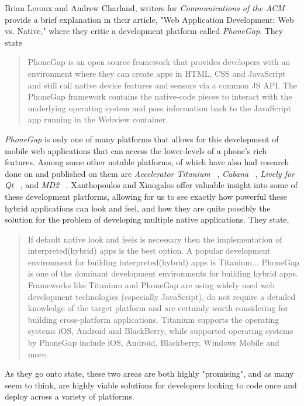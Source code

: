 \documentclass[11pt]{article}
\begin{document}
Brian Leroux and Andrew Charland, writers for {\it Communications of the ACM} provide a brief explanation in their article, "Web Application Development: Web vs. Native," where they critic a development platform called {\it PhoneGap}.  They state

\begin{quote}
PhoneGap is an open source framework that provides developers with an environment where they can create apps in HTML, CSS and JavaScript and still call native device features and sensors via a common JS API.  The PhoneGap framework contains the native-code pieces to interact with the underlying operating system and pass information back to the JavaScript app running in the Webview container. ~\cite{Leroux2011}  
\end{quote}




{\it PhoneGap} is only one of many platforms that allows for this development of mobile web applications that can access the lower-levels of a phone's rich features.  Among some other notable platforms, of which have also had research done on and published on them are {\it Accelerator Titanium} ~\cite{Xanthopoulos2013}, {\it Cabana} ~\cite{Dickson2012}, {\it Lively for Qt} ~\cite{Mikkonen2009}, and {\it MD2} ~\cite{Heitkoetter2013}.  Xanthopoulos and Xinogalos offer valuable insight into some of these development platforms, allowing for us to see exactly how powerful these hybrid applications can look and feel, and how they are quite possibly the solution for the problem of developing multiple native applications. They state,

\begin{quote}
If default native look and feels is necessary then the implementation of interpreted(hybrid) apps is the best option.  A popular development environment for building interpreted(hybrid) apps is Titanium... PhoneGap is one of the dominant development environments for building hybrid apps.  Frameworks like Titanium and PhoneGap are using widely used web development technologies (especially JavaScript), do not require a detailed knowledge of the target platform and are certainly worth considering for building cross-platform applications.  Titanium supports the operating systems iOS, Android and BlackBerry, while supported operating systems by PhoneGap include iOS, Android, Blackberry, Windows Mobile and more.
\end{quote}

As they go onto state, these two areas are both highly "promising", and as many seem to think, are highly viable solutions for developers looking to code once and deploy across a variety of platforms.~\cite{Xanthopoulos2013}
\end{document}

